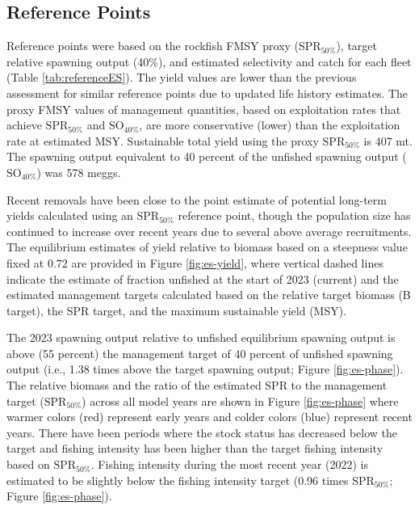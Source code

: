 \documentclass[11pt,
  english,
  letterpaper,
]{article}
\begin{document}
\hypertarget{reference-points}{%
\subsection*{Reference Points}\label{reference-points}}

Reference points were based on the rockfish FMSY proxy (\(\text{SPR}_{50\%}\)), target relative spawning output (40\%), and estimated selectivity and catch for each fleet (Table \ref{tab:referenceES}). The yield values are lower than the previous assessment for similar reference points due to updated life history estimates. The proxy FMSY values of management quantities, based on exploitation rates that achieve \(\text{SPR}_{50\%}\) and \(\text{SO}_{40\%}\), are more conservative (lower) than the exploitation rate at estimated MSY. Sustainable total yield using the proxy \(\text{SPR}_{50\%}\) is 407 mt. The spawning output equivalent to 40 percent of the unfished spawning output (\(\text{SO}_{40\%}\)) was 578 meggs.

Recent removals have been close to the point estimate of potential long-term yields calculated using an \(\text{SPR}_{50\%}\) reference point, though the population size has continued to increase over recent years due to several above average recruitments. The equilibrium estimates of yield relative to biomass based on a steepness value fixed at 0.72 are provided in Figure \ref{fig:es-yield}, where vertical dashed lines indicate the estimate of fraction unfished at the start of 2023 (current) and the estimated management targets calculated based on the relative target biomass (B target), the SPR target, and the maximum sustainable yield (MSY).

The 2023 spawning output relative to unfished equilibrium spawning output is above (55 percent) the management target of 40 percent of unfished spawning output (i.e., 1.38 times above the target spawning output; Figure \ref{fig:es-phase}). The relative biomass and the ratio of the estimated SPR to the management target (\(\text{SPR}_{50\%}\)) across all model years are shown in Figure \ref{fig:es-phase} where warmer colors (red) represent early years and colder colors (blue) represent recent years. There have been periods where the stock status has decreased below the target and fishing intensity has been higher than the target fishing intensity based on \(\text{SPR}_{50\%}\). Fishing intensity during the most recent year (2022) is estimated to be slightly below the fishing intensity target (0.96 times \(\text{SPR}_{50\%}\); Figure \ref{fig:es-phase}).
\end{document}
